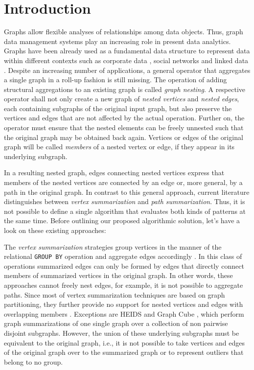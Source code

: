 
\section{Introduction}
Graphs allow flexible analyses of relationships among data objects. Thus, graph data management systems play an increasing role in present data analytics. Graphs have been already used as a fundamental data structure to represent data within different contexts such as corporate data \cite{success,Park2016355}, social networks \cite{xie,BrodkaK14} and linked data \cite{Vasilyeva13}.
Despite an increasing number of applications, a general operator that aggregates a single graph in a roll-up fashion is still missing. %
 The operation of adding structural aggregations to an existing graph is called \textit{graph nesting}.
A respective operator shall not only create a new graph of \textit{nested vertices} and \textit{nested edges}, each containing subgraphs of the original input graph, but also preserve the vertices and edges that are not affected by the actual operation. Further on, the operator must ensure that the nested elements can be freely unnested such that the original graph may be obtained back again. Vertices or edges of the original graph will be called \textit{members} of a nested vertex or edge, if they appear in its underlying subgraph.

In a resulting nested graph, edges connecting nested vertices express that members of the nested vertices are connected by an edge or, more general, by a path in the original graph.
In contrast to this general approach, current literature distinguishes between \textit{vertex summarization} and \textit{path summarization}. Thus, it is not possible to define a single algorithm that evaluates both kinds of patterns at the same time. Before outlining our proposed algorithmic solution, let's have a look on these existing approaches:

The \textit{vertex summarization} strategies group vertices in the manner of the relational \texttt{GROUP BY} operation and aggregate edges accordingly \cite{JunghannsPR17}. In this class of operations summarized edges can only be formed by edges that directly connect members of summarized vertices in the original graph. In other words, these approaches cannot freely nest edges, for example, it is not possible to aggregate paths. Since most of vertex summarization techniques are based on graph partitioning, they further provide no support for nested vertices and edges with overlapping members \cite{yin,Tian20085,jakawat}.
Exceptions are HEIDS \cite{ChengJQ16} and Graph Cube \cite{Zhao11}, which perform graph summarizations of one single graph over a collection of non pairwise disjoint subgraphs. However, the union of these underlying subgraphs must be equivalent to the original graph, i.e., it is not possible to take vertices and edges of the original graph over to the summarized graph or to represent outliers that belong to no group.


